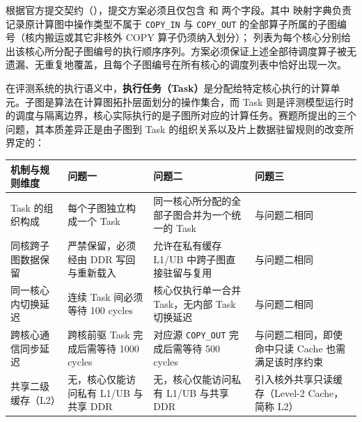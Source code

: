 \documentclass[anonymous,notoc]{gmcm2026}
\begin{document}
根据官方提交契约（\texttt{}），提交方案必须且仅包含 \texttt{} 和 \texttt{} 两个字段。其中 \texttt{} 映射字典负责记录原计算图中操作类型不属于 \texttt{COPY\_IN} 与 \texttt{COPY\_OUT} 的全部算子所属的子图编号（核内搬运或其它非核外 COPY 算子仍须纳入划分）；\texttt{} 列表为每个核心分别给出该核心所分配子图编号的执行顺序序列。方案必须保证上述全部待调度算子被无遗漏、无重复地覆盖，且每个子图编号在所有核心的调度列表中恰好出现一次。

在评测系统的执行语义中，\textbf{执行任务（Task）}是分配给特定核心执行的计算单元。子图是算法在计算图拓扑层面划分的操作集合，而 Task 则是评测模型运行时的调度与隔离边界，核心实际执行的是子图所对应的计算任务。赛题所提出的三个问题，其本质差异正是由子图到 Task 的组织关系以及片上数据驻留规则的改变所界定的：

{\def\LTcaptype{table} %
\begin{table}[!htbp]\centering\small
\begin{tabular}{@{}
  >{\raggedright\arraybackslash}p{}
  >{\raggedright\arraybackslash}p{}
  >{\raggedright\arraybackslash}p{}
  >{\raggedright\arraybackslash}p{}@{}}
\toprule\noalign{}
\begin{minipage}[b]{\linewidth}\raggedright
机制与规则维度
\end{minipage} & \begin{minipage}[b]{\linewidth}\raggedright
问题一
\end{minipage} & \begin{minipage}[b]{\linewidth}\raggedright
问题二
\end{minipage} & \begin{minipage}[b]{\linewidth}\raggedright
问题三
\end{minipage} \\
\midrule\noalign{}


Task 的组织构成 & 每个子图独立构成一个 Task & 同一核心所分配的全部子图合并为一个统一的 Task & 与问题二相同 \\
同核跨子图数据保留 & 严禁保留，必须经由 DDR 写回与重新载入 & 允许在私有缓存 L1/UB 中跨子图直接驻留与复用 & 与问题二相同 \\
同一核心内切换延迟 & 连续 Task 间必须等待 100 cycles & 核心仅执行单一合并 Task，无内部 Task 切换延迟 & 与问题二相同 \\
跨核心通信同步延迟 & 跨核前驱 Task 完成后需等待 1000 cycles & 对应源 \texttt{COPY\_OUT} 完成后需等待 500 cycles & 与问题二相同，即使命中只读 Cache 也需满足该时序约束 \\
共享二级缓存（L2） & 无，核心仅能访问私有 L1/UB 与共享 DDR & 无，核心仅能访问私有 L1/UB 与共享 DDR & 引入核外共享只读缓存（Level-2 Cache，简称 L2） \\
\bottomrule\end{tabular}
\end{table}
}
\end{document}
